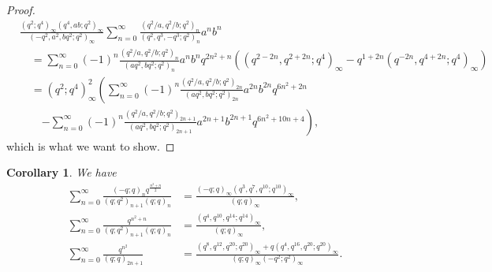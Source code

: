 \documentclass[reqno,12pt]{amsart}
\newtheorem{corollary}[theorem]{Corollary}
\theoremstyle{remark}
\numberwithin{equation}{section}
\begin{document}
\begin{proof}
\begin{align*}
&\frac{\left(q^2;q^4\right)_{\infty}\left(q^4,ab;q^2\right)_{\infty}}
{\left(-q^2,a^2,bq^2;q^2\right)_{\infty}}
\sum_{n=0}^{\infty}\frac{\left(q^2/a,q^2/b;q^2\right)_n}
{\left(q^2,q^3,-q^3;q^2\right)_n}a^nb^n\\
&\quad=\sum_{n=0}^{\infty}\left(-1\right)^n
\frac{\left(q^2/a,q^2/b;q^2\right)_n}{\left(aq^2,bq^2;q^2\right)_n}a^nb^nq^{2n^2+n}
\left(
\left(q^{2-2n},q^{2+2n};q^4\right)_{\infty}-q^{1+2n}
\left(q^{-2n},q^{4+2n};q^4\right)_{\infty}\right)\\
&\quad=\left(q^2;q^4\right)^2_{\infty}\left(\sum_{n=0}^{\infty}\left(-1\right)^n
\frac{\left(q^2/a,q^2/b;q^2\right)_{2n}}{\left(aq^2,bq^2;q^2\right)_{2n}}
a^{2n}b^{2n}q^{6n^2+2n}\right.\\
&\qquad\left.-
\sum_{n=0}^{\infty}\left(-1\right)^n
\frac{\left(q^2/a,q^2/b;q^2\right)_{2n+1}}{\left(aq^2,bq^2;q^2\right)_{2n+1}}
a^{2n+1}b^{2n+1}q^{6n^2+10n+4}\right),
\end{align*}
which is what we want to show.
\end{proof}
\begin{corollary}
We have
\begin{align}
\sum_{n=0}^{\infty}\frac{\left(-q;q\right)_nq^{\frac{n^2+n}{2}}}{\left(q;q^2\right)_{n+1}
\left(q;q\right)_n}
&=\frac{\left(-q;q\right)_{\infty}\left(q^3,q^{7},q^{10};q^{10}\right)_{\infty}}{\left(q;q\right)_{\infty}}
,\tag{S.45}\label{S.45}\\
\sum_{n=0}^{\infty}\frac{q^{n^2+n}}{\left(q;q^2\right)_{n+1}\left(q;q\right)_n}
&=\frac{\left(q^4,q^{10},q^{14};q^{14}\right)_{\infty}}{\left(q;q\right)_{\infty}}
,\tag{S.60}\label{S.60}\\
\sum_{n=0}^{\infty}\frac{q^{n^2}}{\left(q;q\right)_{2n+1}}&=
\frac{\left(q^8,q^{12},q^{20};q^{20}\right)_{\infty}+q\left(q^4,q^{16},q^{20};q^{20}\right)_{\infty}}{\left(q;q\right)_{\infty}\left(-q^2;q^2\right)_{\infty}}.\label{A21}
\end{align}
\end{corollary}
\end{document}
